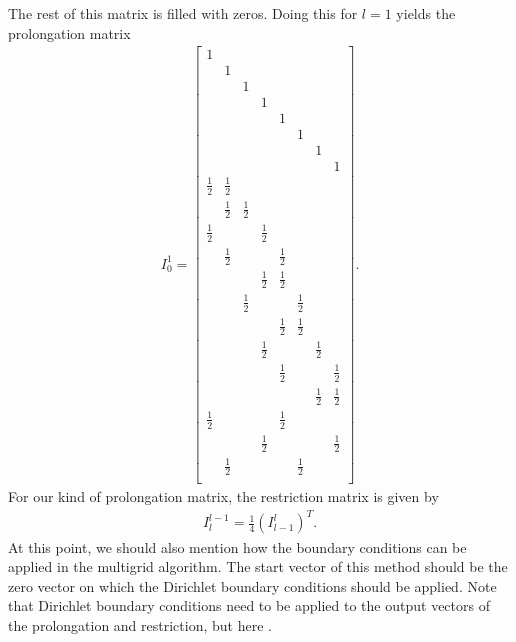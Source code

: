 \documentclass[letterpaper,10pt,english, openany]{sphinxmanual}
\begin{document}
The rest of this matrix is filled with zeros. Doing this for \({l=1}\) yields the prolongation matrix
\begin{equation*}
\begin{split}I_0^1 =
\begin{bmatrix}
1 & & & & & & &  \\
& 1 & & & & & &  \\
& & 1 & & & & &  \\
& & & 1 & & & &  \\
& & & & 1 & & &  \\
& & & & & 1 & &  \\
& & & & & & 1 &  \\
& & & & & & & 1  \\
\frac{1}{2}&\frac{1}{2} & & & & & &  \\
& \frac{1}{2}&\frac{1}{2} & & & & &  \\
\frac{1}{2}& & &\frac{1}{2} & & & & \\
& \frac{1}{2}& & & \frac{1}{2}& & & \\
& & &\frac{1}{2} &\frac{1}{2} & & & \\
& &\frac{1}{2} & & &\frac{1}{2} & & \\
& & & &\frac{1}{2} &\frac{1}{2} & & \\
& & & \frac{1}{2}& & & \frac{1}{2}&  \\
& & & & \frac{1}{2}& & & \frac{1}{2}\\
& & & & & & \frac{1}{2}& \frac{1}{2}\\
\frac{1}{2}& & & &\frac{1}{2} & & & \\
& & &\frac{1}{2} & & & & \frac{1}{2} \\
&\frac{1}{2} & & & & \frac{1}{2}& &  \\
\end{bmatrix}.\end{split}
\end{equation*}
For our kind of prolongation matrix, the restriction matrix is given by
\begin{equation*}
\begin{split}I_l^{l-1} = \frac{1}{4}\left( I_{l-1}^l \right)^T.\end{split}
\end{equation*}
At this point, we should also mention how the boundary conditions can be applied
in the multigrid algorithm. The start vector of this method should be the zero vector on which the Dirichlet boundary conditions should be applied.
Note that Dirichlet boundary conditions need to be applied to the output vectors of the prolongation and restriction,
but here {\color{red}{all Dirichlet boundary conditions are set to be homogeneous}}.
\end{document}
